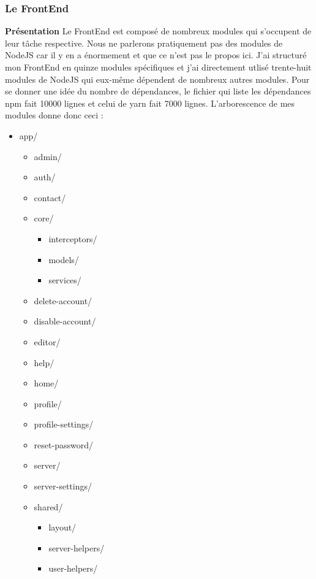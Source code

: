 \documentclass{article}
\begin{document}
\subsubsection{Le FrontEnd}
\textbf{Présentation}
\newline
\newline
Le FrontEnd est composé de nombreux modules qui s'occupent de leur tâche respective. Nous ne parlerons pratiquement pas des modules de NodeJS car il y en a énormement et que ce n'est pas le propos ici.
\newline
J'ai structuré mon FrontEnd en quinze modules spécifiques et j'ai directement utlisé trente-huit modules de NodeJS qui eux-même dépendent de nombreux autres modules.
\newline
Pour se donner une idée du nombre de dépendances, le fichier qui liste les dépendances npm fait 10000 lignes et celui de yarn fait 7000 lignes.
\newline
L'arborescence de mes modules donne donc ceci :
\begin{itemize}
	\item[] app/
	\begin{itemize}
		\item[]admin/
		\item[]auth/
		\item[]contact/
		\item[]core/
		\begin{itemize}
			\item[]interceptors/
			\item[]models/
			\item[]services/
		\end{itemize}
		\item[]delete-account/
		\item[]disable-account/
		\item[]editor/
		\item[]help/
		\item[]home/
		\item[]profile/
		\item[]profile-settings/
		\item[]reset-password/
		\item[]server/
		\item[]server-settings/
		\item[]shared/
		\begin{itemize}
			\item[]layout/
			\item[]server-helpers/
			\item[]user-helpers/
		\end{itemize}
	\end{itemize}
\end{itemize}
\end{document}
